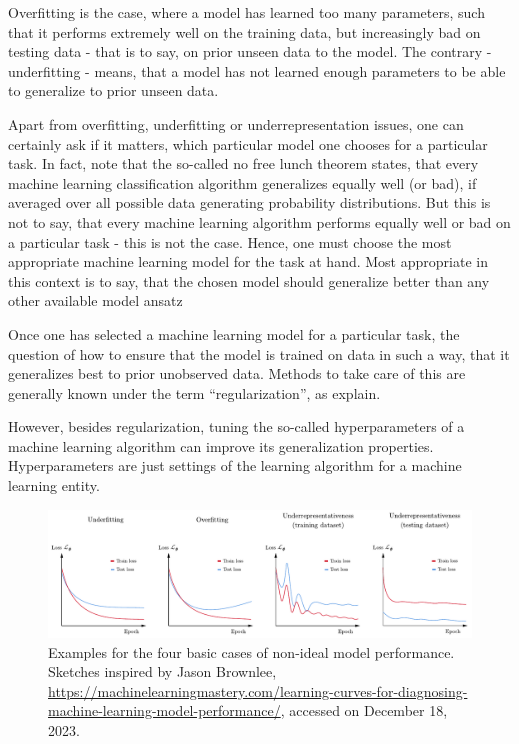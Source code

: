 \documentclass[a4paper,12pt]{report}
\def\lk#1{{\color{black}{#1}}}
\begin{document}
Overfitting is the case, where a model has learned too many parameters, such that it performs extremely well on the training data, but increasingly bad on testing data - that is to say, on prior unseen data to the model. The contrary - underfitting - means, that a model has not learned enough parameters to be able to generalize to prior unseen data.

Apart from overfitting, underfitting or underrepresentation issues, one can certainly ask if it matters, which particular model \lk{ansatz} one chooses for a particular task. In fact, \cite[p.116]{Goodfellow.2016} note that the so-called no free lunch theorem states, that every machine learning classification algorithm generalizes equally well (or bad), if averaged over all possible data generating probability distributions. But this is not to say, that every machine learning algorithm performs equally well or bad on a particular task - this is not the case. Hence, one must choose the most appropriate machine learning model for the task at hand. Most appropriate in this context is to say, that the chosen model should generalize better than any other available model ansatz \lk{for the chosen task.}

Once one has selected a machine learning model for a particular task, the question \lk{arises} of how to ensure that the model is trained on data in such a way, that it generalizes best to prior unobserved data. Methods to take care of this are generally known under the term ``regularization'', as \cite[p.120]{Goodfellow.2016} explain.

However, besides regularization, tuning the so-called hyperparameters of a machine learning algorithm can improve its generalization properties. Hyperparameters are just settings of the learning algorithm for a machine learning entity. \lk{In order to find optimal hyperparameters, either so-called grid search algorithms can be applied; or one can just inspect the learning curves for different settings of hyperparameters.}
\begin{figure}[h]
\centering
\includegraphics[width=\textwidth]{figures/learningcurves.pdf}
\caption{Examples for the four basic cases of non-ideal model performance. Sketches inspired by Jason Brownlee, \url{https://machinelearningmastery.com/learning-curves-for-diagnosing-machine-learning-model-performance/}, accessed on December 18, 2023.}
\label{fig:learningcurves}
\end{figure}
\end{document}
